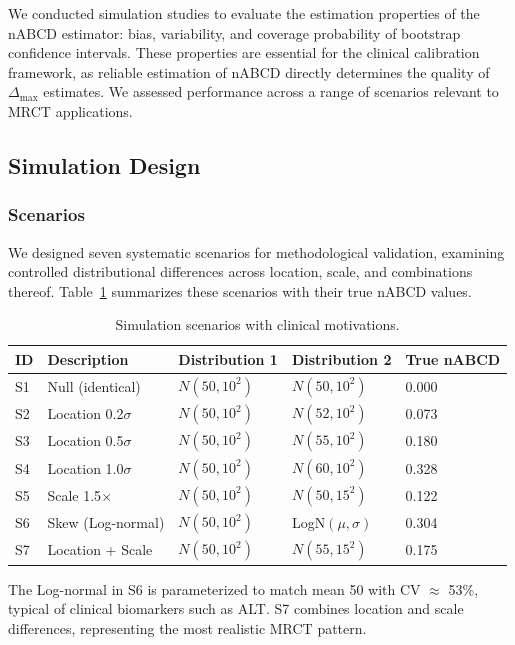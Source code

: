\documentclass[AMA,Times1COL]{WileyNJDv5}
\begin{document}
We conducted simulation studies to evaluate the estimation properties of the nABCD estimator: bias, variability, and coverage probability of bootstrap confidence intervals. These properties are essential for the clinical calibration framework, as reliable estimation of nABCD directly determines the quality of $\Delta_{\max}$ estimates. We assessed performance across a range of scenarios relevant to MRCT applications.

\subsection{Simulation Design}\label{sec:sim_design}

\subsubsection{Scenarios}

We designed seven systematic scenarios for methodological validation, examining controlled distributional differences across location, scale, and combinations thereof. Table~\ref{tab:scenarios} summarizes these scenarios with their true nABCD values.

\begin{table}[ht]
\centering
\caption{Simulation scenarios with clinical motivations.\label{tab:scenarios}}
\begin{tabular}{lllll}
\toprule
\textbf{ID} & \textbf{Description} & \textbf{Distribution 1} & \textbf{Distribution 2} & \textbf{True nABCD} \\
\midrule
S1 & Null (identical) & $N(50, 10^2)$ & $N(50, 10^2)$ & 0.000 \\
S2 & Location 0.2$\sigma$ & $N(50, 10^2)$ & $N(52, 10^2)$ & 0.073 \\
S3 & Location 0.5$\sigma$ & $N(50, 10^2)$ & $N(55, 10^2)$ & 0.180 \\
S4 & Location 1.0$\sigma$ & $N(50, 10^2)$ & $N(60, 10^2)$ & 0.328 \\
S5 & Scale 1.5$\times$ & $N(50, 10^2)$ & $N(50, 15^2)$ & 0.122 \\
S6 & Skew (Log-normal) & $N(50, 10^2)$ & LogN$(\mu, \sigma)$ & 0.304 \\
S7 & Location + Scale & $N(50, 10^2)$ & $N(55, 15^2)$ & 0.175 \\
\bottomrule
\end{tabular}
\begin{tablenotes}
\item The Log-normal in S6 is parameterized to match mean 50 with CV $\approx$ 53\%, typical of clinical biomarkers such as ALT. S7 combines location and scale differences, representing the most realistic MRCT pattern.
\end{tablenotes}
\end{table}
\end{document}

